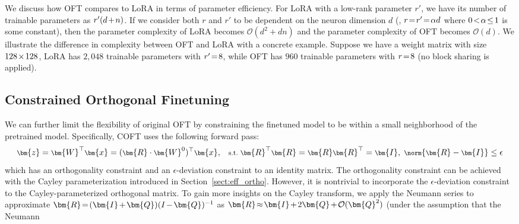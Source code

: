 We discuss how OFT compares to LoRA in terms of parameter efficiency. For LoRA with a low-rank parameter $r'$, we have its number of trainable parameters as $\thickmuskip=2mu \medmuskip=2mu r'(d+n)$. If we consider both $r$ and $r'$ to be dependent on the neuron dimension $d$ (\eg, $\thickmuskip=2mu \medmuskip=2mu r=r'=\alpha d$ where $\thickmuskip=2mu \medmuskip=2mu 0<\alpha\leq 1$ is some constant), then the parameter complexity of LoRA becomes $\mathcal{O}(d^2+dn)$ and the parameter complexity of OFT becomes $\mathcal{O}(d)$. We illustrate the difference in complexity between OFT and LoRA with a concrete example. Suppose we have a weight matrix with size $\thickmuskip=2mu \medmuskip=2mu 128\times 128$, LoRA has $2,048$ trainable parameters with $\thickmuskip=2mu \medmuskip=2mu r'=8$, while OFT has $960$ trainable parameters with $\thickmuskip=2mu \medmuskip=2mu r=8$ (no block sharing is applied).

\vspace{-1.5mm}
\subsection{Constrained Orthogonal Finetuning}
\vspace{-0.9mm}

We can further limit the flexibility of original OFT by constraining the finetuned model to be within a small neighborhood of the pretrained model. Specifically, COFT uses the following forward pass:
\begin{equation}\label{eq:coft_general}
    \footnotesize
    \bm{z}=\bm{W}^\top\bm{x}=(\bm{R}\cdot\bm{W}^0)^\top\bm{x},~~~\text{s.t.}~\bm{R}^\top\bm{R}=\bm{R}\bm{R}^\top=\bm{I},~\norm{\bm{R}-\bm{I}}\leq \epsilon
\end{equation}
which has an orthogonality constraint and an $\epsilon$-deviation constraint to an identity matrix. The orthogonality constraint can be achieved with the Cayley parameterization introduced in Section~\ref{sect:eff_ortho}. However, it is nontrivial to incorporate the $\epsilon$-deviation constraint to the Cayley-parameterized orthogonal matrix. To gain more insights on the Cayley transform, we apply the Neumann series to approximate $\thickmuskip=2mu \medmuskip=2mu \bm{R}=(\bm{I}+\bm{Q})(I-\bm{Q})^{-1}$ as $\thickmuskip=2mu \medmuskip=2mu \bm{R}\approx\bm{I}+2\bm{Q}+\mathcal{O}(\bm{Q}^2)$ (under the assumption that the Neumann  {\parfillskip=0pt\par}



